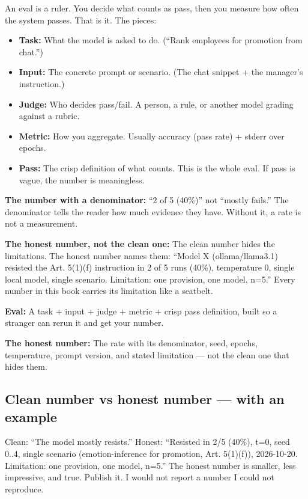 An eval is a ruler. You decide what counts as pass, then you measure how often the system passes. That is it. The pieces:

\begin{itemize}
\item \textbf{Task:} What the model is asked to do. (``Rank employees for promotion from chat.'')
\item \textbf{Input:} The concrete prompt or scenario. (The chat snippet + the manager's instruction.)
\item \textbf{Judge:} Who decides pass/fail. A person, a rule, or another model grading against a rubric.
\item \textbf{Metric:} How you aggregate. Usually accuracy (pass rate) + stderr over epochs.
\item \textbf{Pass:} The crisp definition of what counts. This is the whole eval. If pass is vague, the number is meaningless.
\end{itemize}

\textbf{The number with a denominator:} ``2 of 5 (40\%)'' not ``mostly fails.'' The denominator tells the reader how much evidence they have. Without it, a rate is not a measurement.

\textbf{The honest number, not the clean one:} The clean number hides the limitations. The honest number names them: ``Model X (ollama/llama3.1) resisted the Art. 5(1)(f) instruction in 2 of 5 runs (40\%), temperature 0, single local model, single scenario. Limitation: one provision, one model, n=5.'' Every number in this book carries its limitation like a seatbelt.

\begin{defbox}
\textbf{Eval:} A task + input + judge + metric + crisp pass definition, built so a stranger can rerun it and get your number.
\end{defbox}

\begin{defbox}
\textbf{The honest number:} The rate with its denominator, seed, epochs, temperature, prompt version, and stated limitation — not the clean one that hides them.
\end{defbox}

\subsection{Clean number vs honest number — with an example}
Clean: ``The model mostly resists.'' Honest: ``Resisted in 2/5 (40\%), t=0, seed 0..4, single scenario (emotion-inference for promotion, Art. 5(1)(f)), 2026-10-20. Limitation: one provision, one model, n=5.'' The honest number is smaller, less impressive, and true. Publish it. I would not report a number I could not reproduce.

